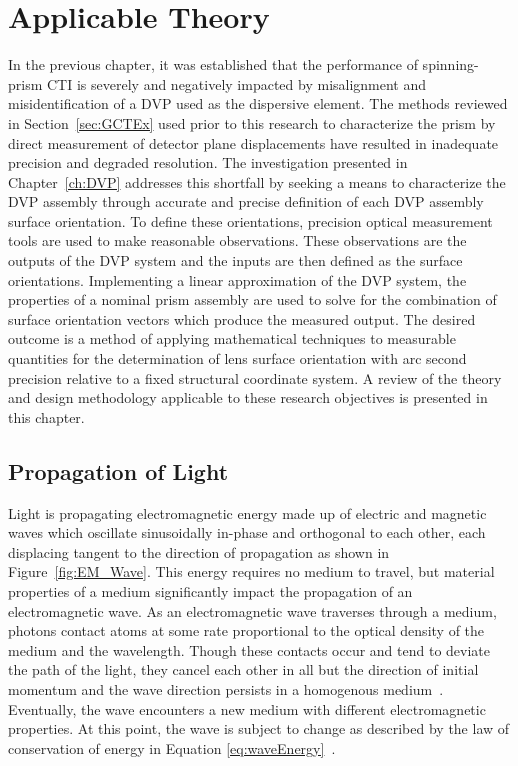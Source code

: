 \chapter{Applicable Theory}
\label{ch:applicableTheory}

In the previous chapter, it was established that the performance of spinning-prism \acf{CTI} is severely and negatively impacted by misalignment and misidentification of a \acf{DVP} used as the dispersive element. The methods reviewed in Section~\ref{sec:GCTEx} used prior to this research to characterize the prism by direct measurement of detector plane displacements have resulted in inadequate precision and degraded resolution. The investigation presented in Chapter~\ref{ch:DVP} addresses this shortfall by seeking a means to characterize the \ac{DVP} assembly through accurate and precise definition of each \ac{DVP} assembly surface orientation. To define these orientations, precision optical measurement tools are used to make reasonable observations. These observations are the outputs of the \ac{DVP} system and the inputs are then defined as the surface orientations. Implementing a linear approximation of the \ac{DVP} system, the properties of a nominal prism assembly are used to solve for the combination of surface orientation vectors which produce the measured output. The desired outcome is a method of applying mathematical techniques to measurable quantities for the determination of lens surface orientation with arc second precision relative to a fixed structural coordinate system. A review of the theory and design methodology applicable to these research objectives is presented in this chapter.

\section{Propagation of Light}
\label{sec:propLight}

Light is propagating electromagnetic energy made up of electric and magnetic waves which oscillate sinusoidally in-phase and orthogonal to each other, each displacing tangent to the direction of propagation as shown in Figure~\ref{fig:EM_Wave}. This energy requires no medium to travel, but material properties of a medium significantly impact the propagation of an electromagnetic wave. As an electromagnetic wave traverses through a medium, photons contact atoms at some rate proportional to the optical density of the medium and the wavelength. Though these contacts occur and tend to deviate the path of the light, they cancel each other in all but the direction of initial momentum and the wave direction persists in a homogenous medium~\cite{Hecht}. Eventually, the wave encounters a new medium with different electromagnetic properties. At this point, the wave is subject to change as described by the law of conservation of energy in Equation \eqref{eq:waveEnergy}~\cite{Hecht}.

